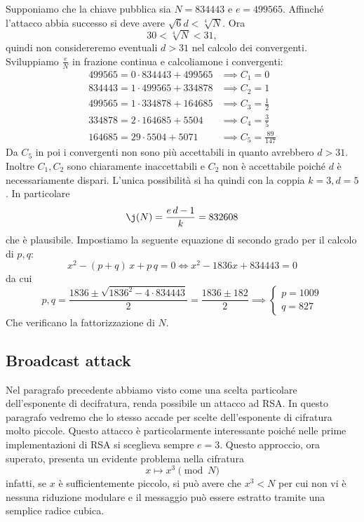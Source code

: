 	\begin{ese}
	Supponiamo che la chiave pubblica sia \(N=834443\) e \(e=499565\).
	Affinché l'attacco abbia successo si deve avere \(\sqrt{6}d < \sqrt[4]{N}\). Ora
		\[
		30 < \sqrt[4]{N} < 31,
		\]
	quindi non considereremo eventuali \(d>31\) nel calcolo dei convergenti.
	Sviluppiamo \(\frac{e}{N}\) in frazione continua e calcoliamone i convergenti:
		\begin{align*}
		499565 = 0 \cdot 834443 + 499565 & \implies C_1 = 0\\
		834443 = 1 \cdot 499565 + 334878 & \implies C_2 = 1\\
		499565 = 1 \cdot 334878 + 164685 & \implies C_3 = \frac{1}{2}\\
		334878 = 2 \cdot 164685 + 5504 & \implies C_4 = \frac{3}{5}\\
		164685 = 29 \cdot 5504 + 5071 & \implies C_5 = \frac{89}{147} 
		\end{align*}
	Da \(C_5\) in poi i convergenti non sono più accettabili in quanto avrebbero \(d>31\).
	Inoltre \(C_1,C_2\) sono chiaramente inaccettabili e \(C_2\) non è accettabile poiché \(d\) è necessariamente dispari.
	L'unica possibilità si ha quindi con la coppia \(k=3,d=5\). In particolare
		\[
		\j(N) = \frac{e\,d-1}{k} = 832608
		\]
	che è plausibile.
	Impostiamo la seguente equazione di secondo grado per il calcolo di \(p,q\):
		\[
		x^2-(p+q)\,x+p\,q = 0 \iff x^2 - 1836 x + 834443 = 0
		\]
	da cui
		\[
		p,q = \frac{1836\pm\sqrt{1836^2-4 \cdot 834443}}{2} = \frac{1836\pm 182}{2} \implies
		\begin{cases}
		p = 1009\\
		q = 827
		\end{cases}
		\]
	Che verificano la fattorizzazione di \(N\).
	\end{ese}

\subsection{Broadcast attack}

	Nel paragrafo precedente abbiamo visto come una scelta particolare dell'esponente di decifratura, renda possibile un attacco ad RSA.
	In questo paragrafo vedremo che lo stesso accade per scelte dell'esponente di cifratura molto piccole.
	Questo attacco è particolarmente interessante poiché nelle prime implementazioni di RSA si sceglieva sempre \(e=3\).
	Questo approccio, ora superato, presenta un evidente problema nella cifratura
		\[
		x \longmapsto x^3 \pmod{N}
		\]
	infatti, se \(x\) è sufficientemente piccolo, si può avere che \(x^3<N\) per cui non vi è nessuna riduzione modulare e il messaggio può essere estratto tramite una semplice radice cubica.

